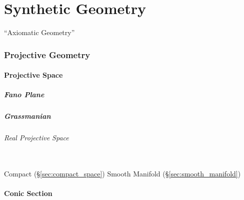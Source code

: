 \part{Synthetic Geometry}\label{part:synthetic_geometry}

``Axiomatic Geometry''



\section{Projective Geometry}\label{sec:projective_geometry}

\subsection{Projective Space}\label{sec:projective_space}

\subsubsection{Fano Plane}\label{sec:fano_plane}

\subsubsection{Grassmanian}\label{sec:grassmanian}

\paragraph{Real Projective Space}\label{sec:real_projective_space}
\hfill \\

Compact (\S\ref{sec:compact_space}) Smooth Manifold
(\S\ref{sec:smooth_manifold})



\subsection{Conic Section}\label{sec:conic_section}



